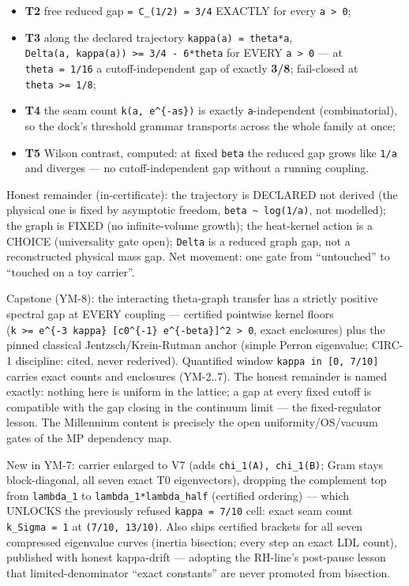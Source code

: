 \begin{itemize}
\tightlist
\item
  \textbf{T2} free reduced gap \texttt{=\ C\_(1/2)\ =\ 3/4} EXACTLY for every \texttt{a\ \textgreater{}\ 0};
\item
  \textbf{T3} along the declared trajectory \texttt{kappa(a)\ =\ theta*a},
  \texttt{Delta(a,\ kappa(a))\ \textgreater{}=\ 3/4\ -\ 6*theta} for EVERY \texttt{a\ \textgreater{}\ 0} --- at
  \texttt{theta\ =\ 1/16} a cutoff-independent gap of exactly \textbf{3/8}; fail-closed
  at \texttt{theta\ \textgreater{}=\ 1/8};
\item
  \textbf{T4} the seam count \texttt{k(a,\ e\^{}\{-as\})} is exactly \texttt{a}-independent
  (combinatorial), so the dock's threshold grammar transports across the
  whole family at once;
\item
  \textbf{T5} Wilson contrast, computed: at fixed \texttt{beta} the reduced gap grows
  like \texttt{1/a} and diverges --- no cutoff-independent gap without a running
  coupling.
\end{itemize}

Honest remainder (in-certificate): the trajectory is DECLARED not derived
(the physical one is fixed by asymptotic freedom, \texttt{beta\ \textasciitilde{}\ log(1/a)}, not
modelled); the graph is FIXED (no infinite-volume growth); the heat-kernel
action is a CHOICE (universality gate open); \texttt{Delta} is a reduced graph
gap, not a reconstructed physical mass gap. Net movement: one gate from
``untouched'' to ``touched on a toy carrier''.

Capstone (YM-8): the interacting theta-graph transfer has a strictly
positive spectral gap at EVERY coupling --- certified pointwise kernel
floors (\texttt{k\ \textgreater{}=\ e\^{}\{-3\ kappa\}\ {[}c0\^{}\{-1\}\ e\^{}\{-beta\}{]}\^{}2\ \textgreater{}\ 0}, exact enclosures)
plus the pinned classical Jentzsch/Krein-Rutman anchor (simple Perron
eigenvalue; CIRC-1 discipline: cited, never rederived). Quantified window
\texttt{kappa\ in\ {[}0,\ 7/10{]}} carries exact counts and enclosures (YM-2..7). The
honest remainder is named exactly: nothing here is uniform in the lattice;
a gap at every fixed cutoff is compatible with the gap closing in the
continuum limit --- the fixed-regulator lesson. The Millennium content is
precisely the open uniformity/OS/vacuum gates of the MP dependency map.

New in YM-7: carrier enlarged to V7 (adds \texttt{chi\_1(A),\ chi\_1(B)}; Gram stays
block-diagonal, all seven exact T0 eigenvectors), dropping the complement
top from \texttt{lambda\_1} to \texttt{lambda\_1*lambda\_half} (certified ordering) --- which
UNLOCKS the previously refused \texttt{kappa\ =\ 7/10} cell: exact seam count
\texttt{k\_Sigma\ =\ 1} at \texttt{(7/10,\ 13/10)}. Also ships certified brackets for all
seven compressed eigenvalue curves (inertia bisection; every step an exact
LDL count), published with honest kappa-drift --- adopting the RH-line's
post-pause lesson that limited-denominator ``exact constants'' are never
promoted from bisection.

